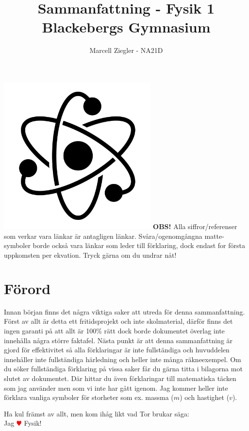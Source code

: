 \documentclass[12pt, a4paper]{article}
\title{Sammanfattning - Fysik 1 \\ Blackebergs Gymnasium}
\author{Marcell Ziegler - NA21D}
\theoremstyle{definition}
\begin{document}
    \begin{titlepage}
        \maketitle
        \centering
        \vfill
        \includegraphics[width=0.6\textwidth]{title.jpg}
        \vfill
        \textbf{OBS!} Alla siffror/referenser som verkar vara länkar är antagligen länkar. Svåra/ogenomgångna matte-symboler borde också vara länkar som leder till förklaring, dock endast for första uppkomsten per ekvation. Tryck gärna om du undrar nåt!
    \end{titlepage}

    \tableofcontents

    \newpage

    \section*{Förord}
    Innan början finns det några viktiga saker att utreda för denna sammanfattning. Först av allt är detta ett fritidsprojekt och inte skolmaterial, därför finns det ingen garanti på att allt är 100\% rätt dock borde dokumentet överlag inte innehålla några större faktafel. Nästa punkt är att denna sammanfattning är gjord för effektivitet så alla förklaringar är inte fullständiga och huvuddelen innehåller inte fullständiga härledning och heller inte många räkneexempel. Om du söker fullständiga förklaring på vissa saker får du gärna titta i bilagorna mot slutet av dokumentet. Där hittar du även förklaringar till matematiska täcken som jag använder men som vi inte har gått igenom. Jag kommer heller inte förklara vanliga symboler för storheter som ex. massma ($m$) och hastighet ($v$).
    \begin{center}
        \large{Ha kul främst av allt, men kom ihåg likt vad Tor brukar säga:}\\
        \Large{Jag \textcolor{red}{$\varheartsuit$} Fysik!}
    \end{center}
\end{document}
